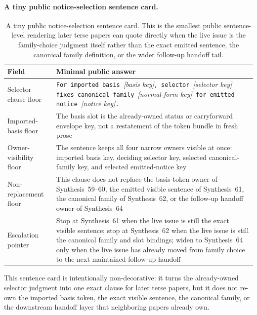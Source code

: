\documentclass[11pt]{article}
\begin{document}
\paragraph{A tiny public notice-selection sentence card.}
\begin{table}[t]
\centering
\small
\begin{tabularx}{\linewidth}{@{}lX@{}}
\toprule
Field & Minimal public answer \\
\midrule
Selector clause floor & \texttt{For imported basis }\emph{[basis key]}\texttt{, selector }\emph{[selector key]}\texttt{ fixes canonical family }\emph{[normal-form key]}\texttt{ for emitted notice }\emph{[notice key]}\texttt{.} \\
Imported-basis floor & The basis slot is the already-owned status or carryforward envelope key, not a restatement of the token bundle in fresh prose \\
Owner-visibility floor & The sentence keeps all four narrow owners visible at once: imported basis key, deciding selector key, selected canonical-family key, and selected emitted-notice key \\
Non-replacement floor & This clause does not replace the basis-token owner of Synthesis~59--60, the emitted visible sentence of Synthesis~61, the canonical family of Synthesis~62, or the follow-up handoff owner of Synthesis~64 \\
Escalation pointer & Stop at Synthesis~61 when the live issue is still the exact visible sentence; stop at Synthesis~62 when the live issue is still the canonical family and slot bindings; widen to Synthesis~64 only when the live issue has already moved from family choice to the next maintained follow-up handoff \\
\bottomrule
\end{tabularx}
\caption{A tiny public notice-selection sentence card. This is the smallest public sentence-level rendering later terse papers can quote directly when the live issue is the family-choice judgment itself rather than the exact emitted sentence, the canonical family definition, or the wider follow-up handoff tail.}
\label{tab:tiny-public-notice-selection-sentence-card}
\end{table}

This sentence card is intentionally non-decorative: it turns the already-owned selector judgment into one exact clause for later terse papers, but it does not re-own the imported basis token, the exact visible sentence, the canonical family, or the downstream handoff layer that neighboring papers already own.\cite{series:workedexample}
\end{document}
